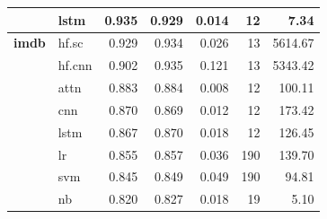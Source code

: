 \documentclass[final]{clv2025}
\begin{document}
\begin{table}[h!]
{\begin{tabular}{@{}p{2cm}p{1.2cm}rrrrr@{}}
 & lstm & 0.935 & 0.929 & 0.014 & 12 & 7.34 \\
\midrule
\textbf{imdb} & hf.sc & 0.929 & 0.934 & 0.026 & 13 & 5614.67 \\
 & hf.cnn & 0.902 & 0.935 & 0.121 & 13 & 5343.42 \\
 & attn & 0.883 & 0.884 & 0.008 & 12 & 100.11 \\
 & cnn & 0.870 & 0.869 & 0.012 & 12 & 173.42 \\
 & lstm & 0.867 & 0.870 & 0.018 & 12 & 126.45 \\
 & lr & 0.855 & 0.857 & 0.036 & 190 & 139.70 \\
 & svm & 0.845 & 0.849 & 0.049 & 190 & 94.81 \\
 & nb & 0.820 & 0.827 & 0.018 & 19 & 5.10 \\
\bottomrule
\end{tabular}%
}
\end{table}
\end{document}
